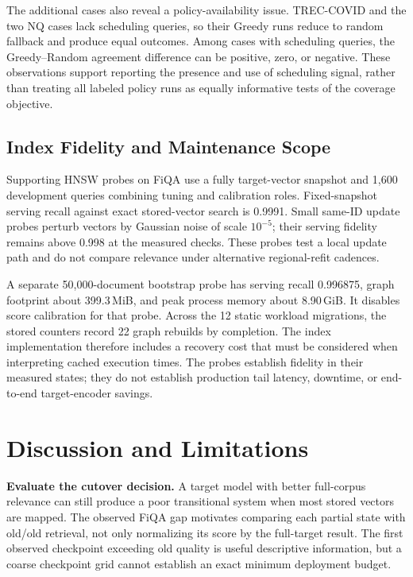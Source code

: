 \documentclass[runningheads]{llncs}
\begin{document}
The additional cases also reveal a policy-availability issue. TREC-COVID and the two NQ cases lack scheduling queries, so their Greedy runs reduce to random fallback and produce equal outcomes. Among cases with scheduling queries, the Greedy--Random agreement difference can be positive, zero, or negative. These observations support reporting the presence and use of scheduling signal, rather than treating all labeled policy runs as equally informative tests of the coverage objective.

\subsection{Index Fidelity and Maintenance Scope}

Supporting HNSW probes on FiQA use a fully target-vector snapshot and 1,600 development queries combining tuning and calibration roles. Fixed-snapshot serving recall against exact stored-vector search is 0.9991. Small same-ID update probes perturb vectors by Gaussian noise of scale $10^{-5}$; their serving fidelity remains above 0.998 at the measured checks. These probes test a local update path and do not compare relevance under alternative regional-refit cadences.

A separate 50,000-document bootstrap probe has serving recall 0.996875, graph footprint about 399.3\,MiB, and peak process memory about 8.90\,GiB. It disables score calibration for that probe. Across the 12 static workload migrations, the stored counters record 22 graph rebuilds by completion. The index implementation therefore includes a recovery cost that must be considered when interpreting cached execution times. The probes establish fidelity in their measured states; they do not establish production tail latency, downtime, or end-to-end target-encoder savings.

\section{Discussion and Limitations}

\textbf{Evaluate the cutover decision.} A target model with better full-corpus relevance can still produce a poor transitional system when most stored vectors are mapped. The observed FiQA gap motivates comparing each partial state with old/old retrieval, not only normalizing its score by the full-target result. The first observed checkpoint exceeding old quality is useful descriptive information, but a coarse checkpoint grid cannot establish an exact minimum deployment budget.
\end{document}
